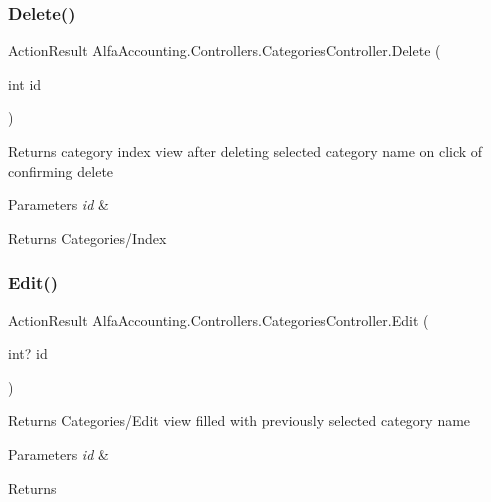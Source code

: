 \subsubsection{\texorpdfstring{Delete()}{Delete()}}
{\footnotesize\ttfamily Action\+Result Alfa\+Accounting.\+Controllers.\+Categories\+Controller.\+Delete (\begin{DoxyParamCaption}\item[{int}]{id }\end{DoxyParamCaption})}



Returns category index view after deleting selected category name on click of confirming delete 


\begin{DoxyParams}{Parameters}
{\em id} & \\
\hline
\end{DoxyParams}
\begin{DoxyReturn}{Returns}
Categories/\+Index
\end{DoxyReturn}
\mbox{\label{class_alfa_accounting_1_1_controllers_1_1_categories_controller_a43567ef33be19e3785f033d50de30fa6}} 
\subsubsection{\texorpdfstring{Edit()}{Edit()}\hspace{0.1cm}{\footnotesize\ttfamily [1/2]}}
{\footnotesize\ttfamily Action\+Result Alfa\+Accounting.\+Controllers.\+Categories\+Controller.\+Edit (\begin{DoxyParamCaption}\item[{int?}]{id }\end{DoxyParamCaption})}



Returns Categories/\+Edit view filled with previously selected category name 


\begin{DoxyParams}{Parameters}
{\em id} & \\
\hline
\end{DoxyParams}
\begin{DoxyReturn}{Returns}

\end{DoxyReturn}
\mbox{\label{class_alfa_accounting_1_1_controllers_1_1_categories_controller_a142fd9f355a35281c7ad9ff87ab918a0}} 
